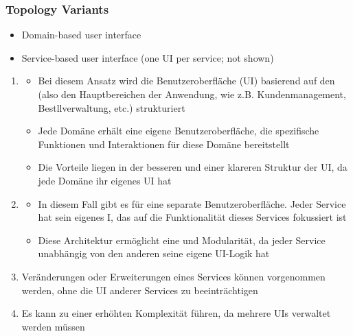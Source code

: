 \subsubsection*{Topology Variants}
\begin{defBox}[title=Non-monolithic user interfaces]
    \begin{itemize}
        \item Domain-based user interface
        \item Service-based user interface (one UI per service; not shown)
    \end{itemize}
\end{defBox}
\begin{infoBox}[title=Nicht-monolitische Benutzeroberflächen]
    \begin{enumerate}
        \item {}
        \begin{itemize}
            \item Bei diesem Ansatz wird die Benutzeroberfläche (UI) basierend auf den  (also den Hauptbereichen der Anwendung, wie z.B. Kundenmanagement, Bestllverwaltung, etc.) strukturiert
            \item Jede Domäne erhält eine eigene Benutzeroberfläche, die spezifische Funktionen und Interaktionen für diese Domäne bereitstellt
            \item Die Vorteile liegen in der besseren  und einer klareren Struktur der UI, da jede Domäne ihr eigenes UI hat
        \end{itemize}
        \item {}
        \begin{itemize}
            \item In diesem Fall gibt es für  eine separate Benutzeroberfläche. Jeder Service hat sein eigenes I, das auf die Funktionalität dieses Services fokussiert ist
            \item Diese Architektur ermöglicht eine  und Modularität, da jeder Service unabhängig von den anderen seine eigene UI-Logik hat
        \end{itemize}
        \item {} Veränderungen oder Erweiterungen eines Services können vorgenommen werden, ohne die UI anderer Services zu beeinträchtigen
        \item {} Es kann zu einer erhöhten Komplexität führen, da mehrere UIs verwaltet werden müssen
    \end{enumerate}
\end{infoBox}
